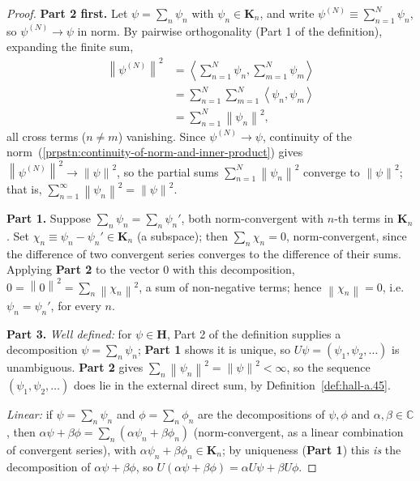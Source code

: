 \begin{proof}
    \leanok
\textbf{Part 2 first.} Let $\psi = \sum_n \psi_n$ with $\psi_n \in \mathbf{K}_n$, and write $\psi^{(N)} \equiv \sum_{n=1}^N \psi_n$, so $\psi^{(N)} \to \psi$ in norm. By pairwise orthogonality (Part 1 of the definition), expanding the finite sum,
\begin{align}
    \left\| \psi^{(N)} \right\|^2 &= \left< \sum_{n=1}^N \psi_n, \sum_{m=1}^N \psi_m \right> \\
                &= \sum_{n=1}^N \sum_{m=1}^N \left< \psi_n, \psi_m \right> \\
                &= \sum_{n=1}^N \left\| \psi_n \right\|^2,
\end{align}
all cross terms ($n\ne m$) vanishing. Since $\psi^{(N)} \to \psi$, continuity of the norm~(\ref{prpstn:continuity-of-norm-and-inner-product}) gives $\left\| \psi^{(N)} \right\|^2 \to \left\| \psi \right\|^2$, so the partial sums $\sum_{n=1}^N \left\| \psi_n \right\|^2$ converge to $\left\| \psi \right\|^2$; that is, $\sum_{n=1}^\infty \left\| \psi_n \right\|^2 = \left\| \psi \right\|^2$.

\textbf{Part 1.} Suppose $\sum_n \psi_n = \sum_n \psi_n'$, both norm-convergent with $n$-th terms in $\mathbf{K}_n$. Set $\chi_n \equiv \psi_n - \psi_n' \in \mathbf{K}_n$ (a subspace); then $\sum_n \chi_n = 0$, norm-convergent, since the difference of two convergent series converges to the difference of their sums. Applying \textbf{Part 2} to the vector $0$ with this decomposition, $0 = \left\| 0 \right\|^2 = \sum_n \left\| \chi_n \right\|^2$, a sum of non-negative terms; hence $\left\| \chi_n \right\| = 0$, i.e. $\psi_n = \psi_n'$, for every $n$.

\textbf{Part 3.} \textit{Well defined:} for $\psi \in \mathbf{H}$, Part 2 of the definition supplies a decomposition $\psi = \sum_n \psi_n$; \textbf{Part 1} shows it is unique, so $U\psi = (\psi_1,\psi_2,\ldots)$ is unambiguous. \textbf{Part 2} gives $\sum_n \left\| \psi_n \right\|^2 = \left\| \psi \right\|^2 < \infty$, so the sequence $(\psi_1,\psi_2,\ldots)$ does lie in the external direct sum, by Definition~\ref{def:hall-a.45}.

\textit{Linear:} if $\psi = \sum_n \psi_n$ and $\phi = \sum_n \phi_n$ are the decompositions of $\psi,\phi$ and $\alpha,\beta \in \mathbb{C}$, then $\alpha\psi + \beta\phi = \sum_n (\alpha\psi_n + \beta\phi_n)$ (norm-convergent, as a linear combination of convergent series), with $\alpha\psi_n+\beta\phi_n \in \mathbf{K}_n$; by uniqueness (\textbf{Part 1}) this \textit{is} the decomposition of $\alpha\psi+\beta\phi$, so $U(\alpha\psi+\beta\phi) = \alpha U\psi + \beta U\phi$.


\end{proof}
